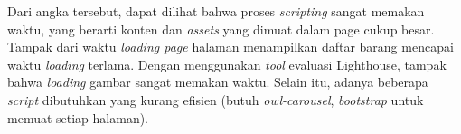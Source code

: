 Dari angka tersebut, dapat dilihat bahwa proses \textit{scripting} sangat memakan waktu, yang berarti konten dan \textit{assets} yang dimuat dalam page cukup besar. Tampak dari waktu \textit{loading page} halaman menampilkan daftar barang mencapai waktu \textit{loading} terlama. Dengan menggunakan \textit{tool} evaluasi Lighthouse, tampak bahwa \textit{loading} gambar sangat memakan waktu. Selain itu, adanya beberapa \textit{script} dibutuhkan yang kurang efisien (butuh \textit{owl-carousel}, \textit{bootstrap} untuk memuat setiap halaman). \\